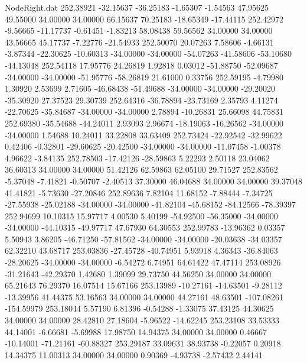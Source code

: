 \begin{filecontents}{NodeRight.dat}
 252.38921  -32.15637  -36.25183    -1.65307   -1.54563   47.95625   49.55000   34.00000   34.00000   66.15637   70.25183  -18.65349  -17.44115
 252.42972   -9.56665  -11.17737    -0.61451   -1.83213   58.08438   59.56562   34.00000   34.00000   43.56665   45.17737   -7.22776  -21.54933
 252.50070   20.07263    7.58606    -4.66131   -3.87344  -22.30625  -10.60313  -34.00000  -34.00000  -54.07263  -41.58606  -53.10680  -44.13048
 252.54118   17.95776   24.26819     1.92818    0.03012  -51.88750  -52.09687  -34.00000  -34.00000  -51.95776  -58.26819   21.61000    0.33756
 252.59195   -4.79980    1.30920     2.53699    2.71605  -46.68438  -51.49688  -34.00000  -34.00000  -29.20020  -35.30920   27.37523   29.30739
 252.64316  -36.78894  -23.73169     2.35793    4.11274  -22.70625  -35.84687  -34.00000  -34.00000    2.78894  -10.26831   25.66098   44.75831
 252.69380  -35.54688  -44.24011     2.93093    2.96674  -18.19063  -16.26562  -34.00000  -34.00000    1.54688   10.24011   33.22808   33.63409
 252.73424  -22.92542  -32.99622     0.42406   -0.32801  -29.60625  -20.42500  -34.00000  -34.00000  -11.07458   -1.00378    4.96622   -3.84135
 252.78503  -17.42126  -28.59863     5.22293    2.50118   23.04062   36.60313   34.00000   34.00000   51.42126   62.59863   62.05100   29.71527
 252.83562   -5.37048   -7.41821    -0.50707   -2.40513   37.30000   46.04688   34.00000   34.00000   39.37048   41.41821   -5.73630  -27.20846
 252.89636    7.82104   11.68152    -7.88444   -7.34725  -27.55938  -25.02188  -34.00000  -34.00000  -41.82104  -45.68152  -84.12566  -78.39397
 252.94699   10.10315   15.97717     4.00530    5.40199  -54.92500  -56.35000  -34.00000  -34.00000  -44.10315  -49.97717   47.67930   64.30553
 252.99783  -13.96362    0.03357     5.50943    3.86205  -46.71250  -57.81562  -34.00000  -34.00000  -20.03638  -34.03357   62.32210   43.68717
 253.03836  -27.45728  -40.74951     5.93918    4.36343  -36.84063  -28.20625  -34.00000  -34.00000   -6.54272    6.74951   64.61422   47.47114
 253.08926  -31.21643  -42.29370     1.42680    1.39099   29.73750   44.56250   34.00000   34.00000   65.21643   76.29370   16.07514   15.67166
 253.13989  -10.27161  -14.63501    -9.28112  -13.39956   41.44375   53.16563   34.00000   34.00000   44.27161   48.63501 -107.08261 -154.59979
 253.18044    5.57190    6.81396    -0.54288   -1.33075   37.43125   44.30625   34.00000   34.00000   28.42810   27.18604   -5.96522  -14.62245
 253.23108   33.53333   44.14001    -6.66681   -5.69988   17.98750   14.94375   34.00000   34.00000    0.46667  -10.14001  -71.21161  -60.88327
 253.29187   33.09631   38.93738    -0.22057    0.20918   14.34375   11.00313   34.00000   34.00000    0.90369   -4.93738   -2.57432    2.44141

\end{filecontents}
